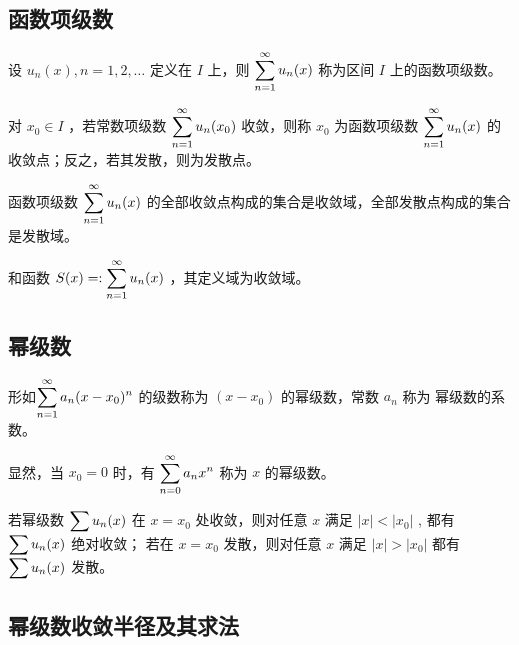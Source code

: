 \subsection{函数项级数}

\begin{Def}[函数项级数]

    设 $ u_n(x),n=1,2,\dots $ 定义在 $ I $ 上，则 $ \displaystyle \sum_{n=1}^{\infty}u_n(x) $ 
    称为区间 $ I $ 上的函数项级数。
\end{Def}

\begin{Def}[收敛点与收敛域]

    对 $ x_0\in I $ ，若常数项级数 $\displaystyle \sum_{n=1}^{\infty}u_n(x_0) $ 收敛，则称 $ x_0 $ 为函数项级数
    $ \displaystyle \sum_{n=1}^{\infty}u_n(x) $ 的收敛点；反之，若其发散，则为发散点。

    函数项级数 $ \displaystyle \sum_{n=1}^{\infty}u_n(x) $ 的全部收敛点构成的集合是收敛域，全部发散点构成的集合
    是发散域。
\end{Def}

\begin{Def}[和函数]

    和函数 $\displaystyle S(x) =: \sum_{n=1}^{\infty}u_n(x) $ ，其定义域为收敛域。
\end{Def}

\subsection{幂级数}

\begin{Def}[幂级数]

    形如$ \displaystyle \sum_{n=1}^\infty a_n(x-x_0)^n $ 的级数称为 $ (x-x_0) $ 的幂级数，常数 $ a_n $ 称为
    幂级数的系数。
\end{Def}

显然，当 $ x_0 = 0 $ 时，有 $ \displaystyle \sum_{n=0}^{\infty}a_nx^n $ 称为 $ x $ 的幂级数。

\begin{Theo}[阿贝尔定理]

    若幂级数 $\displaystyle \sum u_n(x) $ 在 $ x = x_0 $ 处收敛，则对任意 $ x $ 满足 $ |x| < |x_0| $ ,
    都有$ \displaystyle \sum u_n(x) $ 绝对收敛；
    若在 $ x = x_0 $ 发散，则对任意 $ x $ 满足 $ |x|>|x_0| $ 都有$\displaystyle \sum u_n(x) $ 发散。
\end{Theo}

\subsection{幂级数收敛半径及其求法}


